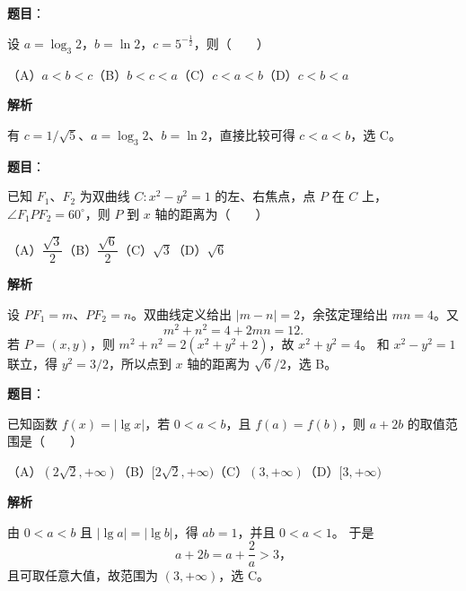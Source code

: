 \begin{answer}

\textbf{题目}：

设 $a=\log_3 2$，$b=\ln2$，$c=5^{-\frac12}$，则\mbox{（　　）}

（A）$a<b<c$\quad（B）$b<c<a$\quad（C）$c<a<b$\quad（D）$c<b<a$

\textbf{解析}

有 $c=1/\sqrt5$、$a=\log_3 2$、$b=\ln2$，直接比较可得
$c<a<b$，选 C。


\end{answer}
\begin{answer}

\textbf{题目}：

已知 $F_1\text{、}F_2$ 为双曲线 $C:x^2-y^2=1$ 的左、右焦点，点 $P$ 在 $C$ 上，$\angle F_1PF_2=60^\circ$，则 $P$ 到 $x$ 轴的距离为\mbox{（　　）}

（A）$\dfrac{\sqrt3}{2}$\quad（B）$\dfrac{\sqrt6}{2}$\quad（C）$\sqrt3$\quad（D）$\sqrt6$

\textbf{解析}

设 $PF_1=m$、$PF_2=n$。双曲线定义给出 $|m-n|=2$，余弦定理给出
$m n=4$。又
\nopagebreak[4]
\[
m^2+n^2=4+2mn=12.
\]
若 $P=(x,y)$，则 $m^2+n^2=2(x^2+y^2+2)$，故 $x^2+y^2=4$。
和 $x^2-y^2=1$ 联立，得 $y^2=3/2$，所以点到 $x$ 轴的距离为
$\sqrt6/2$，选 B。


\end{answer}
\begin{answer}

\textbf{题目}：

已知函数 $f(x)=|\lg x|$，若 $0<a<b$，且 $f(a)=f(b)$，则 $a+2b$ 的取值范围是\mbox{（　　）}

（A）$(2\sqrt2,+\infty)$\quad（B）$[2\sqrt2,+\infty)$\quad（C）$(3,+\infty)$\quad（D）$[3,+\infty)$

\textbf{解析}

由 $0<a<b$ 且 $|\lg a|=|\lg b|$，得 $ab=1$，并且 $0<a<1$。
于是
\nopagebreak[4]
\[
a+2b=a+\frac2a>3\text{，}
\]
且可取任意大值，故范围为 $(3,+\infty)$，选 C。


\end{answer}
